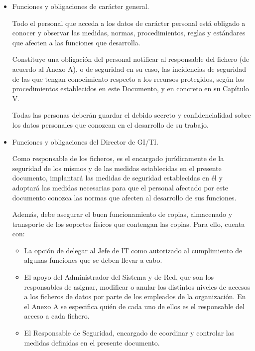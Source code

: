 \documentclass[a4paper,11pt,bibtotoc,noliststotoc]{scrbook}
\begin{document}
\begin{itemize}
\item Funciones y obligaciones de carácter general.

Todo el personal que acceda a los datos de carácter personal está obligado a conocer y observar las medidas, normas, procedimientos, reglas y estándares que afecten a las funciones que desarrolla.

Constituye una obligación del personal notificar al responsable del fichero (de acuerdo al Anexo A), o de seguridad en su caso, las incidencias de seguridad de las que tengan conocimiento respecto a los recursos protegidos, según los procedimientos establecidos en este Documento, y en concreto en su Capítulo V.

Todas las personas deberán guardar el debido secreto y confidencialidad sobre los datos personales que conozcan en el desarrollo de su trabajo.

\item Funciones y obligaciones del Director de GI/TI. 

Como responsable de los ficheros, es el encargado jurídicamente de la seguridad de los mismos y de las medidas establecidas en el presente documento, implantará las medidas de seguridad establecidas en él y adoptará las medidas necesarias para que el personal afectado por este documento conozca las
normas que afecten al desarrollo de sus funciones.

Además, debe asegurar el buen funcionamiento de copias, almacenado y transporte de los soportes físicos que contengan las copias. Para ello, cuenta con:

\begin {itemize}
\item La opción de delegar al Jefe de IT como autorizado al cumplimiento de algunas funciones que se deben llevar a cabo.

\item El apoyo del Administrador del Sistema y de Red, que son los responsables de asignar, modificar o anular los distintos niveles de accesos a los ficheros de datos por parte de los empleados de la organización. En el Anexo A se especifica quién de cada uno de ellos es el responsable del acceso a cada fichero.

\item El Responsable de Seguridad, encargado de coordinar y controlar las medidas definidas en el presente documento.
\end{itemize}

\end{itemize}
\end{document}
